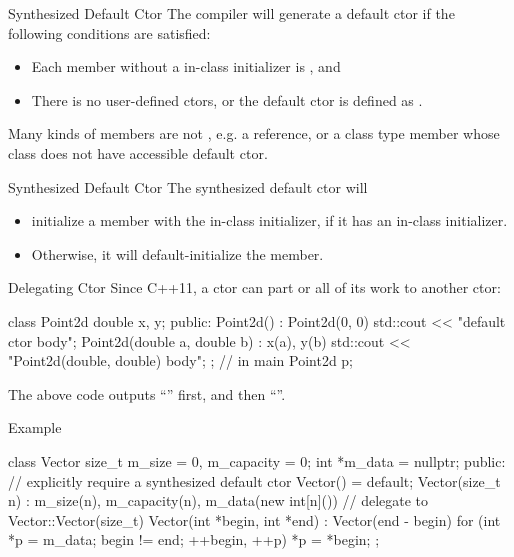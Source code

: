 \documentclass{beamer}
\begin{document}
\begin{frame}{Synthesized Default Ctor}
    The compiler will generate a default ctor if the following conditions are satisfied:
    \begin{itemize}
        \item Each member without a in-class initializer is , and
        \item There is no user-defined ctors, or the default ctor is defined as .
    \end{itemize}
    Many kinds of members are not , e.g. a reference, or a class type member whose class does not have accessible default ctor.
\end{frame}

\begin{frame}{Synthesized Default Ctor}
    The synthesized default ctor will
    \begin{itemize}
        \item initialize a member with the in-class initializer, if it has an in-class initializer.
        \item Otherwise, it will default-initialize the member.
    \end{itemize}
\end{frame}

\begin{frame}[fragile]{Delegating Ctor}
    Since C++11, a ctor can  part or all of its work to another ctor:
    \begin{cpp}
class Point2d {
  double x, y;
 public:
  Point2d() : Point2d(0, 0) {
    std::cout << "default ctor body\n";
  }
  Point2d(double a, double b) : x(a), y(b) {
    std::cout << "Point2d(double, double) body\n";
  }
};
// in main
Point2d p;
    \end{cpp}
    The above code outputs ``'' first, and then ``''.
\end{frame}

\begin{frame}[fragile]{Example}
    \begin{cpp}
class Vector {
  size_t m_size = 0, m_capacity = 0;
  int *m_data = nullptr;
 public:
  // explicitly require a synthesized default ctor
  Vector() = default;
  Vector(size_t n) : m_size(n), m_capacity(n),
    m_data(new int[n]()) {}
  // delegate to Vector::Vector(size_t)
  Vector(int *begin, int *end) : Vector(end - begin) {
    for (int *p = m_data; begin != end; ++begin, ++p)
      *p = *begin;
  }
};
    \end{cpp}
\end{frame}
\end{document}
